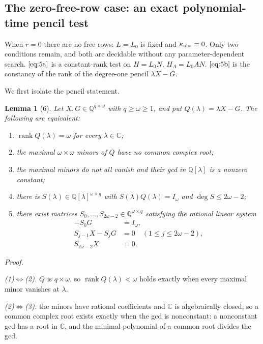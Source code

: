 \documentclass[journal]{IEEEtran}
\theoremstyle{plainn}
\newtheorem*{lem}{Lemma}
\begin{document}
\subsection{The zero-free-row case: an exact polynomial-time pencil test}\label{sec:zero}
When $r=0$ there are no free rows: $L=L_0$ is fixed and $\kappa_{\rm obs}=0$. Only two conditions remain, and both are decidable without any parameter-dependent search. $\eqref{eq:5a}$ is a constant-rank test on $H=L_0N$, $H_A=L_0AN$. $\eqref{eq:5b}$ is the constancy of the rank of the degree-one pencil $\lambda X-G$.

We first isolate the pencil statement.

\begin{lem}[6] Let $X,G\in\mathbb Q^{q\times\omega}$ with $q\ge\omega\ge1$, and put $Q(\lambda)=\lambda X-G$. The following are equivalent:

\begin{enumerate}
\item $\operatorname{rank}Q(\lambda)=\omega$ for every $\lambda\in\mathbb C$;
\item the maximal $\omega\times\omega$ minors of $Q$ have no common complex root;
\item the maximal minors do not all vanish and their gcd in $\mathbb Q[\lambda]$ is a nonzero constant;
\item there is $S(\lambda)\in\mathbb Q[\lambda]^{\omega\times q}$ with $S(\lambda)Q(\lambda)=I_\omega$ and $\deg S\le2\omega-2$;
\item there exist matrices $S_0,\dots,S_{2\omega-2}\in\mathbb Q^{\omega\times q}$ satisfying the rational linear system \begin{equation}
\tag{R0}\label{eq:R0}
\begin{aligned}
-S_0G&=I_\omega,\\
S_{j-1}X-S_jG&=0\quad(1\le j\le2\omega-2),\\
S_{2\omega-2}X&=0 .
\end{aligned}
\end{equation}
\end{enumerate}
\end{lem}
\emph{Proof.}

\emph{(1)$\Leftrightarrow$(2).} $Q$ is $q\times\omega$, so $\operatorname{rank}Q(\lambda)<\omega$ holds exactly when every maximal minor vanishes at $\lambda$.

\emph{(2)$\Leftrightarrow$(3).} the minors have rational coefficients and $\mathbb C$ is algebraically closed, so a common complex root exists exactly when the gcd is nonconstant: a nonconstant gcd has a root in $\mathbb C$, and the minimal polynomial of a common root divides the gcd.
\end{document}
